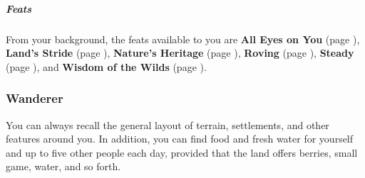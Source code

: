     \subparagraph{Feats} From your background, the feats available to you are
    \textbf{All Eyes on You} (page \pageref{feat::alleyesonyou}),
    \textbf{Land's Stride} (page \pageref{feat::landsstride}),
    \textbf{Nature's Heritage} (page \pageref{feat::naturesheritage}),
    \textbf{Roving} (page \pageref{feat::roving}),
    \textbf{Steady} (page \pageref{feat::steady}), and
    \textbf{Wisdom of the Wilds} (page \pageref{feat::wisdomofthewilds}).

    \subsubsection{Wanderer}
        You can always recall the general layout of terrain, settlements, and other features around you.
        In addition, you can find food and fresh water for yourself and up to five other people each day, provided that the land offers berries, small game, water, and so forth.

\newpage

